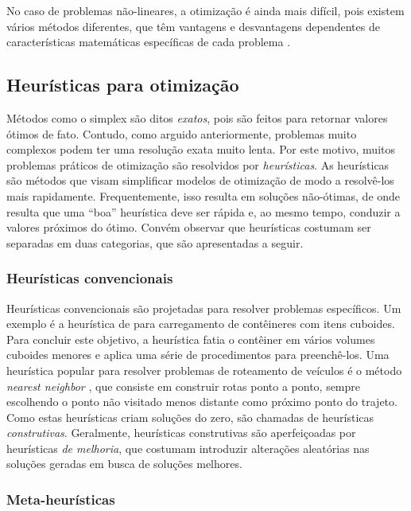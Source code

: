 No caso de problemas não-lineares, a otimização é ainda mais difícil, pois existem vários métodos diferentes, que têm vantagens e desvantagens dependentes de características matemáticas específicas de cada problema \cite{RIBEIRO2013}.

\subsection{Heurísticas para otimização}

Métodos como o simplex são ditos \emph{exatos}, pois são feitos para retornar valores ótimos de fato. Contudo, como arguido anteriormente, problemas muito complexos podem ter uma resolução exata muito lenta. Por este motivo, muitos problemas práticos de otimização são resolvidos por \emph{heurísticas}. As heurísticas são métodos que visam simplificar modelos de otimização de modo a resolvê-los mais rapidamente. Frequentemente, isso resulta em soluções não-ótimas, de onde resulta que uma ``boa'' heurística deve ser rápida e, ao mesmo tempo, conduzir a valores próximos do ótimo. Convém observar que heurísticas costumam ser separadas em duas categorias, que são apresentadas a seguir.

\subsubsection*{Heurísticas convencionais}

Heurísticas convencionais são projetadas para resolver problemas específicos. Um exemplo é a heurística de \textcite{GEORGE1980} para carregamento de contêineres com itens cuboides. Para concluir este objetivo, a heurística fatia o contêiner em vários volumes cuboides menores e aplica uma série de procedimentos para preenchê-los. Uma heurística popular para resolver problemas de roteamento de veículos é o método \emph{nearest neighbor} \cite{LIU2023}, que consiste em construir rotas ponto a ponto, sempre escolhendo o ponto não visitado menos distante como próximo ponto do trajeto. Como estas heurísticas criam soluções do zero, são chamadas de heurísticas \emph{construtivas}. Geralmente, heurísticas construtivas são aperfeiçoadas por heurísticas \emph{de melhoria}, que costumam introduzir alterações aleatórias nas soluções geradas em busca de soluções melhores.

\subsubsection*{Meta-heurísticas}

